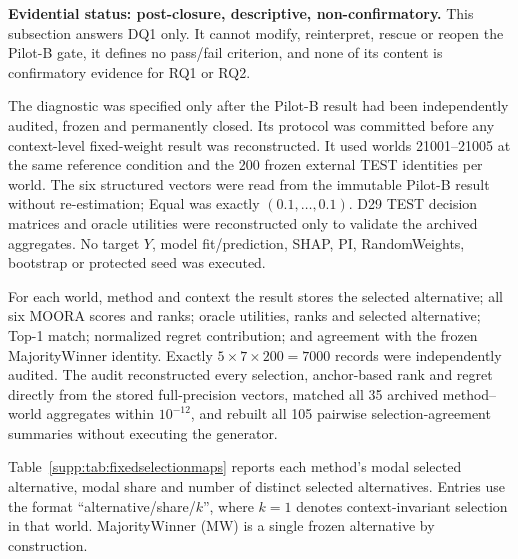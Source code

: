 \documentclass[runningheads,orivec]{llncs}
\begin{document}
\noindent\textbf{Evidential status: post-closure, descriptive, non-confirmatory.} This
subsection answers DQ1 only. It cannot modify, reinterpret, rescue or reopen the Pilot-B gate,
it defines no pass/fail criterion, and none of its content is confirmatory evidence for RQ1 or
RQ2.

The diagnostic was specified only after the Pilot-B result had been independently audited,
frozen and permanently closed. Its protocol was committed before any context-level
fixed-weight result was reconstructed. It used worlds 21001--21005 at the same reference
condition and the 200 frozen external TEST identities per world. The six structured vectors
were read from the immutable Pilot-B result without re-estimation; Equal was exactly
$(0.1,\ldots,0.1)$. D29 TEST decision matrices and oracle utilities were reconstructed only to
validate the archived aggregates. No target $Y$, model fit/prediction, SHAP, PI, RandomWeights,
bootstrap or protected seed was executed.

For each world, method and context the result stores the selected alternative; all six MOORA
scores and ranks; oracle utilities, ranks and selected alternative; Top-1 match; normalized
regret contribution; and agreement with the frozen MajorityWinner identity. Exactly
$5\times7\times200=7000$ records were independently audited. The audit reconstructed every
selection, anchor-based rank and regret directly from the stored full-precision vectors,
matched all 35 archived method--world aggregates within $10^{-12}$, and rebuilt all 105
pairwise selection-agreement summaries without executing the generator.

Table~\ref{supp:tab:fixedselectionmaps} reports each method's modal selected alternative,
modal share and number of distinct selected alternatives. Entries use the format
``alternative/\allowbreak share/\allowbreak $k$'', where $k=1$ denotes
context-invariant selection in that world.
MajorityWinner (MW) is a single frozen alternative by construction.
\end{document}

